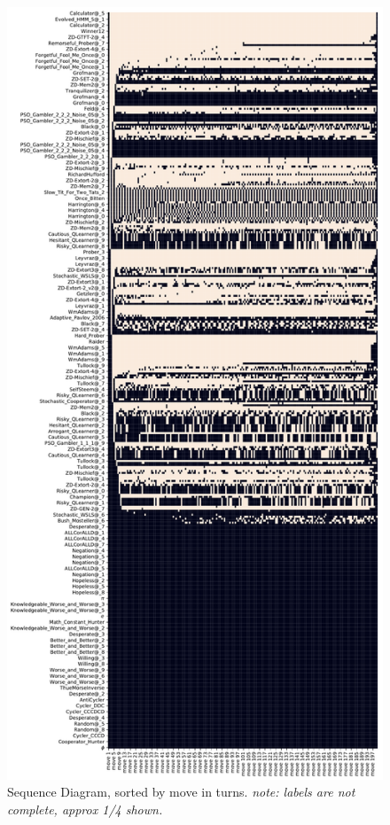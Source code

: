 \begin{figure}[ht]
\begin{minipage}{0.48\textwidth}
    \end{minipage}\hfill
    \begin{minipage}{0.48\textwidth}
        \includegraphics[width=1.0\textwidth, center]{./img/descriptive/sequence_plot_alphabetical_pt2.pdf}
    \end{minipage}
    \caption{Sequence Diagram, sorted by move in turns. \textit{note: labels are not complete, approx 1/4 shown.}}\label{fig:sequence_plot_alphabetical}
\end{figure}

